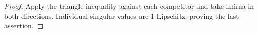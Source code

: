 \begin{proof}
Apply the triangle inequality against each competitor and take infima in both directions. Individual singular values are 1-Lipschitz, proving the last assertion.
\end{proof}
